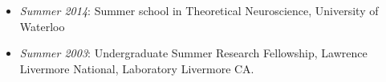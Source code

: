 \begin{itemize}
\tightlist
\item
  \emph{Summer 2014}: Summer school in Theoretical Neuroscience,
  University of Waterloo
\item
  \emph{Summer 2003}: Undergraduate Summer Research Fellowship, Lawrence
  Livermore National, Laboratory Livermore CA.
\end{itemize}
